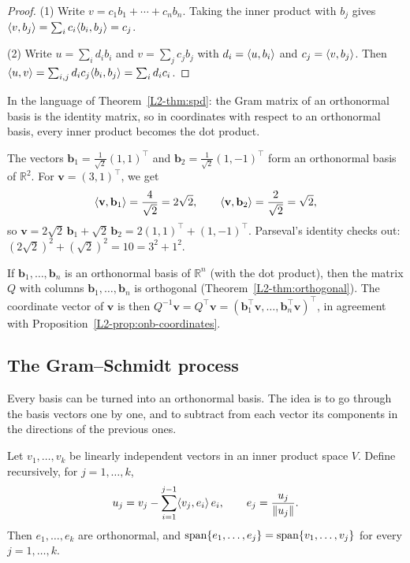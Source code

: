 \begin{proof}
    (1) Write $v = c_1 b_1 + \cdots + c_n b_n$. Taking the inner product with $b_j$ gives $\langle v, b_j \rangle = \sum_i c_i \langle b_i, b_j \rangle = c_j$.

    (2) Write $u = \sum_i d_i b_i$ and $v = \sum_j c_j b_j$ with $d_i = \langle u, b_i \rangle$ and $c_j = \langle v, b_j \rangle$. Then $\langle u, v \rangle = \sum_{i, j} d_i c_j \langle b_i, b_j \rangle = \sum_i d_i c_i$.
\end{proof}

In the language of Theorem~\ref{L2-thm:spd}: the Gram matrix of an orthonormal basis is the identity matrix, so in coordinates with respect to an orthonormal basis, every inner product becomes the dot product.

\begin{example}\label{L2-ex:onb-r2}
    The vectors $\mathbf{b}_1 = \frac{1}{\sqrt{2}}(1, 1)^\top$ and $\mathbf{b}_2 = \frac{1}{\sqrt{2}}(1, -1)^\top$ form an orthonormal basis of $\mathbb{R}^2$. For $\mathbf{v} = (3, 1)^\top$, we get
    \[\langle \mathbf{v}, \mathbf{b}_1 \rangle = \frac{4}{\sqrt{2}} = 2\sqrt{2}, \qquad \langle \mathbf{v}, \mathbf{b}_2 \rangle = \frac{2}{\sqrt{2}} = \sqrt{2},\]
    so $\mathbf{v} = 2\sqrt{2}\, \mathbf{b}_1 + \sqrt{2}\, \mathbf{b}_2 = 2(1, 1)^\top + (1, -1)^\top$. Parseval's identity checks out: $(2\sqrt{2})^2 + (\sqrt{2})^2 = 10 = 3^2 + 1^2$.
\end{example}

\begin{remark}
    If $\mathbf{b}_1, \ldots, \mathbf{b}_n$ is an orthonormal basis of $\mathbb{R}^n$ (with the dot product), then the matrix $Q$ with columns $\mathbf{b}_1, \ldots, \mathbf{b}_n$ is orthogonal (Theorem~\ref{L2-thm:orthogonal}). The coordinate vector of $\mathbf{v}$ is then $Q^{-1} \mathbf{v} = Q^\top \mathbf{v} = (\mathbf{b}_1^\top \mathbf{v}, \ldots, \mathbf{b}_n^\top \mathbf{v})^\top$, in agreement with Proposition~\ref{L2-prop:onb-coordinates}.
\end{remark}

\subsection{The Gram--Schmidt process}

Every basis can be turned into an orthonormal basis. The idea is to go through the basis vectors one by one, and to subtract from each vector its components in the directions of the previous ones.

\begin{theorem}\label{L2-thm:gram-schmidt}
    Let $v_1, \ldots, v_k$ be linearly independent vectors in an inner product space $V$. Define recursively, for $j = 1, \ldots, k$,
    \[u_j = v_j - \sum_{i=1}^{j-1} \langle v_j, e_i \rangle\, e_i, \qquad e_j = \frac{u_j}{\lVert u_j \rVert}.\]
    Then $e_1, \ldots, e_k$ are orthonormal, and $\operatorname{span}\{e_1, \ldots, e_j\} = \operatorname{span}\{v_1, \ldots, v_j\}$ for every $j = 1, \ldots, k$.
\end{theorem}

